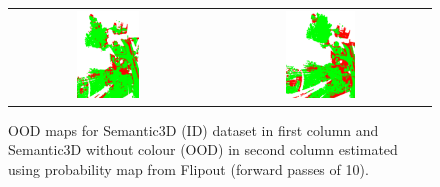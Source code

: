 \begin{figure}[h!]
\begin{tabular}{cc}
            \includegraphics[width=0.33\textwidth, height=0.18\textheight]{images/ood_imgs/sem3d_of/prob/fout_sem3d_OOD_3.pdf}&
            \includegraphics[width=0.33\textwidth, height=0.18\textheight]{images/ood_imgs/sem3d_of/prob/fout_sem3d_of_OOD_3.pdf}\\
        \end{tabular}
        \caption{OOD maps for Semantic3D (ID) dataset in first column and Semantic3D without colour (OOD) in second column estimated using probability map from Flipout (forward passes of 10).}
        \label{fig:fout_oodmap_sem3d_OF_prob}
    \end{figure} 

